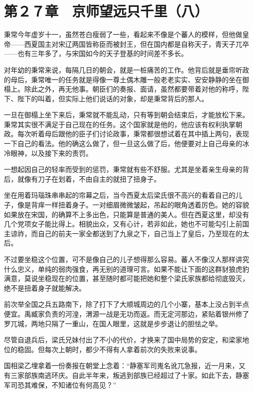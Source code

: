 \section{第２７章　京师望远只千里（八）}

秉常今年虚岁十一，虽然苍白瘦弱了一些，看起来不像是个蕃人的模样，但他做皇帝——西夏国主对宋辽两国皆称臣而被封王，但在国内都是自称天子，青天子兀卒——也有三年多了，与宋国如今的天子登基的时间差不多长。

对年幼的秉常来说，每隔几日的朝会，就是一桩痛苦的工作。他背后就是垂帘听政的母后，秉常唯一的任务就是得像一尊土偶木雕一般老老实实、安安静静的坐在御榻上。除此之外，再无他事。朝臣们的奏报、面请，虽然都要带着对他的称呼，陛下、陛下的叫着，但实际上他们说话的对象，却是秉常背后的那人。

一旦在御榻上坐下来后，秉常就不能乱动，只有等到朝会结束后，才能放松下来。秉常其实很不满足于自己现在的任务。这个国家就是他的，他应该有权利执掌朝政。每次听着母后跟他的臣子们讨论政事，秉常都很想试着在其中插上两句，表现一下自己的看法。他的确这么做了，但一旦这么做了后，他便要对上自己母亲的冰冷眼神，以及接下来的责罚。

一想起因自己的轻率而受到的惩罚，秉常就有些不舒服。尤其是坐着亲生母亲的背后，就像有刀子在划着，不由自主的就扭了扭身子。

坐在用着玛瑙珠串串起的帘幕之后，当今西夏太后梁氏很不高兴的看着自己的儿子，像是背痒一样扭着身子。一对细眉微微皱起，吊起的眼角透着厉色。她的容貌如果放在宋国，的确算不上多出色，只能算是普通的美人。但在西夏这里，却没有几个党项女子能比得上。相貌出众，又有心计，若非如此，她也不可能勾引上前国主谅祚，而自己的前夫一家全都送到了九泉之下，自己当上了皇后，乃至现在的太后。

不过要坐稳这个位置，可不是像自己的儿子想得那么容易。蕃人不像汉人那样讲究什么忠义，单纯的弱肉强食，再无别的道理可言。如果不能让下面的这群豺狼虎豹满意，莫说坐稳现在的位置，甚至随时都可能把她和整个梁氏家族都给彻底毁灭，绝不是扭着身子就能解决。

前次举全国之兵五路南下，除了打下了大顺城周边的几个小寨，基本上没占到半点便宜。禹臧家负责的河湟，渭源一战是无功而返。而无定河那边，紧贴着银州修了罗兀城，两地只隔了一重山，在国人眼里，这就是步步退让的胆怯之举。

尽管自退兵后，梁氏兄妹付出了不小的代价，才换来了国中局势的安定，和梁家地位的稳固。但每次上朝时，都少不得有人拿着前次的失败来说事。

国相梁乙埋拿着一份奏报在朝堂上念着：“静塞军司嵬名讹兀急报，近一月来，又有三家部族南逃环庆。自此半年来，叛逃到部族已经超过了十家。如此下去，静塞军司恐其难保，不知诸位有何高见？”

